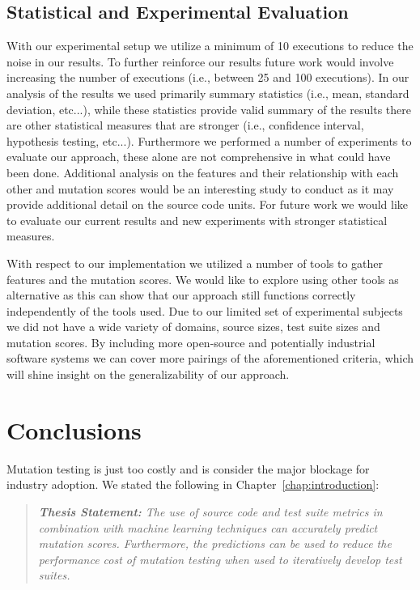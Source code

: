 \subsection{Statistical and Experimental Evaluation}
\label{subsec:conclusions_experimental_evaluation}
With our experimental setup we utilize a minimum of 10 executions to reduce the noise in our results. To further reinforce our results future work would involve increasing the number of executions (i.e., between 25 and 100 executions). In our analysis of the results we used primarily summary statistics (i.e., mean, standard deviation, etc...), while these statistics provide valid summary of the results there are other statistical measures that are stronger (i.e., confidence interval, hypothesis testing, etc...). Furthermore we performed a number of experiments to evaluate our approach, these alone are not comprehensive in what could have been done. Additional analysis on the features and their relationship with each other and mutation scores would be an interesting study to conduct as it may provide additional detail on the source code units. For future work we would like to evaluate our current results and new experiments with stronger statistical measures.

With respect to our implementation we utilized a number of tools to gather features and the mutation scores. We would like to explore using other tools as alternative as this can show that our approach still functions correctly independently of the tools used. Due to our limited set of experimental subjects we did not have a wide variety of domains, source sizes, test suite sizes and mutation scores. By including more open-source and potentially industrial software systems we can cover more pairings of the aforementioned criteria, which will shine insight on the generalizability of our approach.


\section{Conclusions}
\label{sec:conclusions_conclusions}
Mutation testing is just too costly and is consider the major blockage for industry adoption. We stated the following in Chapter~\ref{chap:introduction}:

\begin{quote}
  \emph{\textbf{Thesis Statement:} The use of source code and test suite metrics in combination with machine learning techniques can accurately predict mutation scores. Furthermore, the predictions can be used to reduce the performance cost of mutation testing when used to iteratively develop test suites.}
\end{quote}


